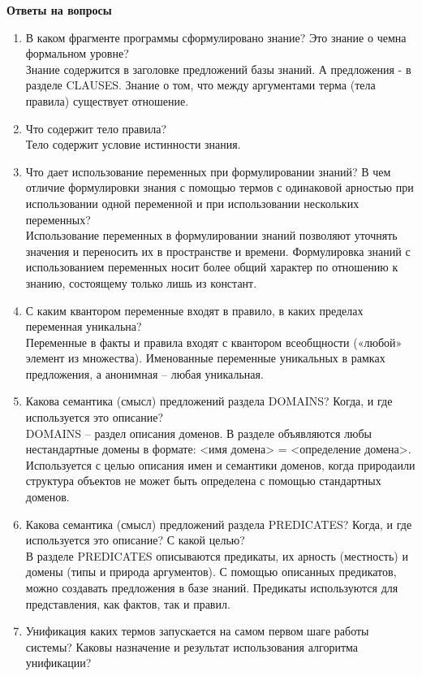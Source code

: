 \documentclass[12pt, a4paper]{extarticle}
\begin{document}
\newpage
\clearpage
\textbf{Ответы на вопросы}\par
\begin{enumerate}
	\item В каком фрагменте программы сформулировано знание? Это знание о чемна формальном уровне?\\
	Знание содержится в заголовке предложений базы знаний. А предложения - в разделе CLAUSES. Знание о том, что между аргументами терма (тела правила) существует отношение.
	\item Что содержит тело правила?\\
	Тело содержит условие истинности знания.
	\item Что дает использование переменных при формулировании знаний? В чем отличие формулировки знания с помощью термов с одинаковой арностью при  использовании  одной  переменной  и  при  использовании  нескольких переменных?\\
	Использование переменных в формулировании знаний позволяют уточнять значения и переносить их в пространстве и времени. Формулировка знаний с использованием переменных носит более общий характер по отношению к знанию, состоящему только лишь из констант. 
	\item С каким квантором переменные входят в правило, в каких пределах переменная уникальна?\\
	Переменные в факты и правила входят с квантором всеобщности («любой» элемент  из  множества). Именованные переменные уникальных в рамках предложения, а анонимная – любая уникальная.
	\item Какова семантика (смысл) предложений раздела DOMAINS? Когда, и где используется это описание?\\
	DOMAINS – раздел описания доменов. В разделе объявляются любы нестандартные домены в формате: <имя  домена> = <определение  домена>. Используется с целью описания имен и семантики доменов, когда природаили структура объектов не может быть определена с помощью стандартных доменов.
	\item Какова семантика (смысл) предложений раздела PREDICATES? Когда, и где используется это описание? С какой целью?\\
	В разделе PREDICATES описываются предикаты, их арность (местность) и домены (типы и природа аргументов). С помощью описанных предикатов, можно создавать предложения в базе знаний. Предикаты используются для представления, как фактов, так и правил.\\
	\item Унификация каких термов запускается на самом первом шаге работы системы? Каковы назначение и результат использования алгоритма унификации?\\

\end{enumerate}
\end{document}
